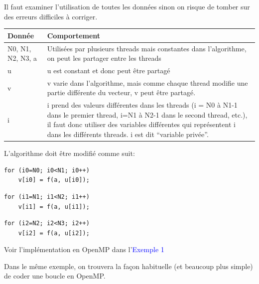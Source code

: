 \documentclass{beamer}
\begin{document}
\begin{frame}[fragile]
Il faut examiner l'utilisation de toutes les données sinon on risque de tomber sur des erreurs difficiles à corriger.

\vfill
\begin{tabular}{|l|l|}
	 \hline
	\bf Donnée & \bf Comportement \\
	 \hline
	 \begin{minipage}[t]{0.23\textwidth}
	 	N0, N1, N2, N3, a 
	\end{minipage}
 & \begin{minipage}[t]{0.75\textwidth}
	 	Utilisées par plusieurs threads mais constantes dans l'algorithme, on peut les partager entre les threads
 	\end{minipage}
 	 \\[25pt]
	 \hline
	 u &  \begin{minipage}[t]{0.75\textwidth}
	 	u est constant et donc peut être partagé\end{minipage}
	 \\[10pt]
	 \hline
	 v &  \begin{minipage}[t]{0.75\textwidth}
	 	v varie dans l'algorithme, mais comme chaque thread modifie une partie différente du vecteur, v peut être partagé.\end{minipage}
	 \\[20pt]
	 \hline
	 i &  \begin{minipage}[t]{0.75\textwidth}
	 	i prend des valeurs différentes dans les threads (i = N0 à N1-1 dans le premier thread, i=N1 à N2-1 dans le second thread, etc.), il faut donc utiliser des variables différentes qui représentent i dans les différents threads. i est dit ``variable privée''.\end{minipage}
	 \\[30pt]
	 \hline
\end{tabular}

\end{frame}

\begin{frame}[fragile]
	L'algorithme doit être modifié comme suit:
	
\begin{lstlisting}
for (i0=N0; i0<N1; i0++)
	v[i0] = f(a, u[i0]);
\end{lstlisting}

\begin{lstlisting}
for (i1=N1; i1<N2; i1++)
	v[i1] = f(a, u[i1]);
\end{lstlisting}

\begin{lstlisting}
for (i2=N2; i2<N3; i2++)
	v[i2] = f(a, u[i2]);
\end{lstlisting}
\vfill

Voir l'implémentation en OpenMP dans l'\textcolor{blue}{Exemple 1}

Dans le même exemple, on trouvera la façon habituelle (et beaucoup plus simple) de coder une boucle en OpenMP.
\end{frame}
\end{document}
